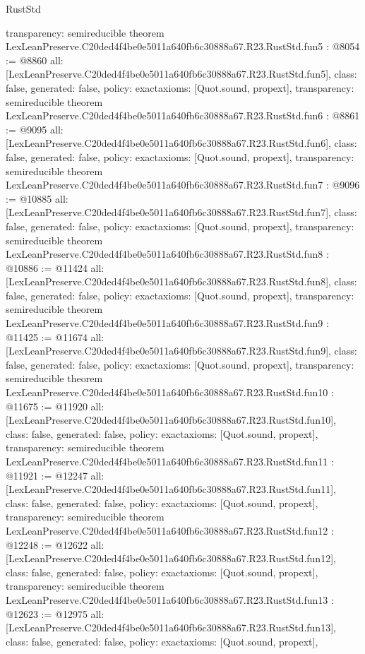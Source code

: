 \begin{lexlean}{RustStd}
\begin{coremodule}
{  transparency: semireducible
}
theorem LexLeanPreserve.C20ded4f4be0e5011a640fb6c30888a67.R23.RustStd.fun5 : @8054 := @8860 {
  all: [LexLeanPreserve.C20ded4f4be0e5011a640fb6c30888a67.R23.RustStd.fun5],
  class: false,
  generated: false,
  policy: exact{axioms: [Quot.sound, propext]},
  transparency: semireducible
}
theorem LexLeanPreserve.C20ded4f4be0e5011a640fb6c30888a67.R23.RustStd.fun6 : @8861 := @9095 {
  all: [LexLeanPreserve.C20ded4f4be0e5011a640fb6c30888a67.R23.RustStd.fun6],
  class: false,
  generated: false,
  policy: exact{axioms: [Quot.sound, propext]},
  transparency: semireducible
}
theorem LexLeanPreserve.C20ded4f4be0e5011a640fb6c30888a67.R23.RustStd.fun7 : @9096 := @10885 {
  all: [LexLeanPreserve.C20ded4f4be0e5011a640fb6c30888a67.R23.RustStd.fun7],
  class: false,
  generated: false,
  policy: exact{axioms: [Quot.sound, propext]},
  transparency: semireducible
}
theorem LexLeanPreserve.C20ded4f4be0e5011a640fb6c30888a67.R23.RustStd.fun8 : @10886 := @11424 {
  all: [LexLeanPreserve.C20ded4f4be0e5011a640fb6c30888a67.R23.RustStd.fun8],
  class: false,
  generated: false,
  policy: exact{axioms: [Quot.sound, propext]},
  transparency: semireducible
}
theorem LexLeanPreserve.C20ded4f4be0e5011a640fb6c30888a67.R23.RustStd.fun9 : @11425 := @11674 {
  all: [LexLeanPreserve.C20ded4f4be0e5011a640fb6c30888a67.R23.RustStd.fun9],
  class: false,
  generated: false,
  policy: exact{axioms: [Quot.sound, propext]},
  transparency: semireducible
}
theorem LexLeanPreserve.C20ded4f4be0e5011a640fb6c30888a67.R23.RustStd.fun10 : @11675 := @11920 {
  all: [LexLeanPreserve.C20ded4f4be0e5011a640fb6c30888a67.R23.RustStd.fun10],
  class: false,
  generated: false,
  policy: exact{axioms: [Quot.sound, propext]},
  transparency: semireducible
}
theorem LexLeanPreserve.C20ded4f4be0e5011a640fb6c30888a67.R23.RustStd.fun11 : @11921 := @12247 {
  all: [LexLeanPreserve.C20ded4f4be0e5011a640fb6c30888a67.R23.RustStd.fun11],
  class: false,
  generated: false,
  policy: exact{axioms: [Quot.sound, propext]},
  transparency: semireducible
}
theorem LexLeanPreserve.C20ded4f4be0e5011a640fb6c30888a67.R23.RustStd.fun12 : @12248 := @12622 {
  all: [LexLeanPreserve.C20ded4f4be0e5011a640fb6c30888a67.R23.RustStd.fun12],
  class: false,
  generated: false,
  policy: exact{axioms: [Quot.sound, propext]},
  transparency: semireducible
}
theorem LexLeanPreserve.C20ded4f4be0e5011a640fb6c30888a67.R23.RustStd.fun13 : @12623 := @12975 {
  all: [LexLeanPreserve.C20ded4f4be0e5011a640fb6c30888a67.R23.RustStd.fun13],
  class: false,
  generated: false,
  policy: exact{axioms: [Quot.sound, propext]},
}
\end{coremodule}
\end{lexlean}
